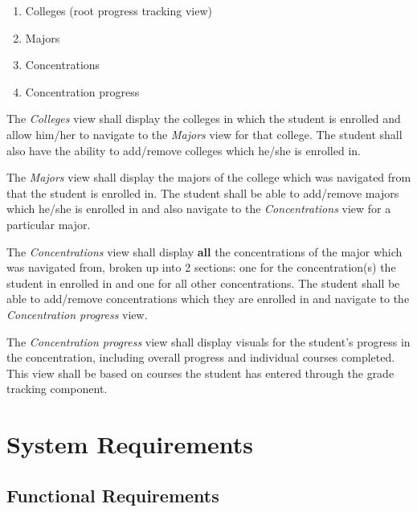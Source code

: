 \documentclass[12pt]{article}
\begin{document}
\begin{enumerate}
    \item Colleges (root progress tracking view)
    \item Majors
    \item Concentrations
    \item Concentration progress
\end{enumerate}

The \textit{Colleges} view shall display the colleges in which the student is enrolled and allow
him/her to navigate to the \textit{Majors} view for that college. The student shall also have the
ability to add/remove colleges which he/she is enrolled in.

The \textit{Majors} view shall display the majors of the college which was navigated from that the
student is enrolled in. The student shall be able to add/remove majors which he/she is enrolled in
and also navigate to the \textit{Concentrations} view for a particular major.

The \textit{Concentrations} view shall display \textbf{all} the concentrations of the major which
was navigated from, broken up into 2 sections: one for the concentration(s) the student in enrolled
in and one for all other concentrations. The student shall be able to add/remove concentrations
which they are enrolled in and navigate to the \textit{Concentration progress} view.

The \textit{Concentration progress} view shall display visuals for the student's progress in the
concentration, including overall progress and individual courses completed. This view shall be based
on courses the student has entered through the grade tracking component.

\section{System Requirements}
\subsection{Functional Requirements}

\newcommand{\screenshot}[2]{
  \begin{figure}[H]
    \centering
    \texttt{[image: \#1.png]}
    \caption{#2}
  \end{figure}
}

\newcommand{\screenshotstep}[3]{
  \clearpage
  \item #1
    \screenshot{#2}{#3}
}
\end{document}
